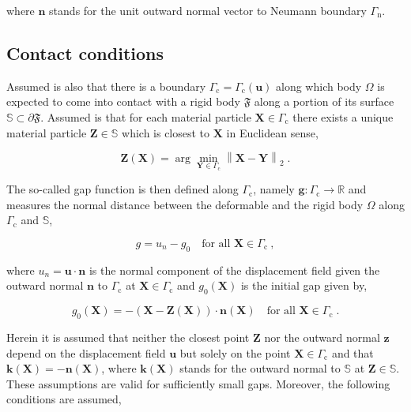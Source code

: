 \documentclass[10pt,a4paper]{article}
\begin{document}
where $\mathbf{n}$ stands for the unit outward normal vector to Neumann boundary $\Gamma_{\text{n}}$.

\subsection{Contact conditions}\label{subsec:contact_conditions}

Assumed is also that there is a boundary $\Gamma_{\text{c}} = \Gamma_{\text{c}} (\mathbf{u})$ along which body $\Omega$ is expected to come into contact with a rigid body $\mathfrak{F}$ along a portion of its surface $\mathbb{S} \subset \partial \mathfrak{F}$. Assumed is that for each material particle $\mathbf{X} \in \Gamma_{\text{c}}$ there exists a unique material particle $\mathbf{Z} \in \mathbb{S}$ which is closest to $\mathbf{X}$ in Euclidean sense,

\begin{equation}
	\mathbf{Z} (\mathbf{X}) = \arg \min_{\mathbf{Y} \in \Gamma_{\text{c}}} \left\| \mathbf{X} - \mathbf{Y} \right\|_2 \;. \label{eq:euclidean_distance}
\end{equation}

The so-called gap function is then defined along $\Gamma_{\text{c}}$, namely $\mathbf{g}:\Gamma_{\text{c}} \rightarrow \mathbb{R}$ and measures the normal distance between the deformable and the rigid body $\Omega$ along $\Gamma_{\text{c}}$ and $\mathbb{S}$,

\begin{equation}
	g = u_n - g_0 \quad \text{for all }\mathbf{X} \in \Gamma_{\text{c}} \:, \label{eq:gap_function}
\end{equation}

where $u_n = \mathbf{u} \cdot\mathbf{n}$ is the normal component of the displacement field given the outward normal $\mathbf{n}$ to $\Gamma_{\text{c}}$ at $\mathbf{X} \in \Gamma_{\text{c}}$ and $g_0(\mathbf{X})$ is the initial gap given by,

\begin{equation}
	g_0(\mathbf{X}) = - (\mathbf{X} - \mathbf{Z}(\mathbf{X})) \cdot \mathbf{n}(\mathbf{X}) \quad \text{for all }\mathbf{X} \in \Gamma_{\text{c}} \;. \label{eq:initial_gap}
\end{equation}

Herein it is assumed that neither the closest point $\mathbf{Z}$ nor the outward normal $\mathbf{z}$ depend on the displacement field $\mathbf{u}$ but solely on the point $\mathbf{X} \in \Gamma_{\text{c}}$ and that $\mathbf{k} (\mathbf{X}) = - \mathbf{n} (\mathbf{X})$, where $\mathbf{k} (\mathbf{X})$ stands for the outward normal to $\mathbb{S}$ at $\mathbf{Z} \in \mathbb{S}$. These assumptions are valid for sufficiently small gaps. Moreover, the following conditions are assumed,
\end{document}
